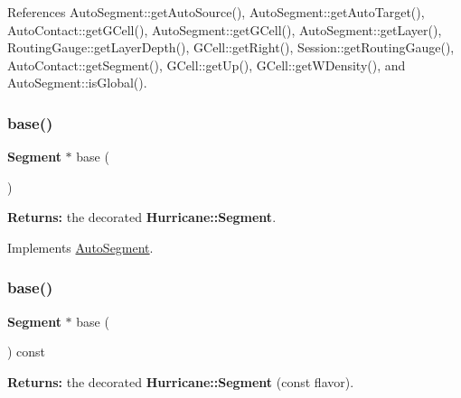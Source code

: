 References Auto\+Segment\+::get\+Auto\+Source(), Auto\+Segment\+::get\+Auto\+Target(), Auto\+Contact\+::get\+G\+Cell(), Auto\+Segment\+::get\+G\+Cell(), Auto\+Segment\+::get\+Layer(), Routing\+Gauge\+::get\+Layer\+Depth(), G\+Cell\+::get\+Right(), Session\+::get\+Routing\+Gauge(), Auto\+Contact\+::get\+Segment(), G\+Cell\+::get\+Up(), G\+Cell\+::get\+W\+Density(), and Auto\+Segment\+::is\+Global().

\mbox{\label{classKatabatic_1_1AutoVertical_a9e651c17b47f82166a02865c9296a2df}} 
\subsubsection{\texorpdfstring{base()}{base()}\hspace{0.1cm}{\footnotesize\ttfamily [1/2]}}
{\footnotesize\ttfamily \textbf{ Segment} $\ast$ base (\begin{DoxyParamCaption}{ }\end{DoxyParamCaption})\hspace{0.3cm}{\ttfamily [virtual]}}

{\bfseries Returns\+:} the decorated \textbf{ Hurricane\+::\+Segment}. 

Implements \mbox{\hyperlink{classKatabatic_1_1AutoSegment_ade416d0483aefe986988fa89a7cf6fcf}{Auto\+Segment}}.

\mbox{\label{classKatabatic_1_1AutoVertical_a6f14a3faa93f2c610ea0d2cc7d903706}} 
\subsubsection{\texorpdfstring{base()}{base()}\hspace{0.1cm}{\footnotesize\ttfamily [2/2]}}
{\footnotesize\ttfamily \textbf{ Segment} $\ast$ base (\begin{DoxyParamCaption}{ }\end{DoxyParamCaption}) const\hspace{0.3cm}{\ttfamily [virtual]}}

{\bfseries Returns\+:} the decorated \textbf{ Hurricane\+::\+Segment} (const flavor). 

